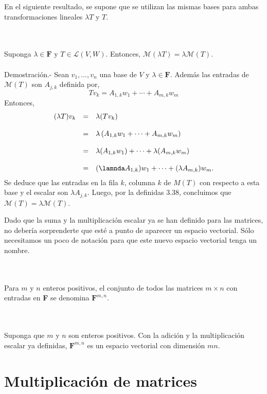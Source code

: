 En el siguiente resultado, se supone que se utilizan las mismas bases para ambas transformaciones lineales $\lambda T$ y $T$.

\begin{myteo}\;\\\\
    Suponga $\lambda \in \textbf{F}$ y $T\in \mathcal{L}(V,W)$. Entonces, $\mathcal{M}(\lambda T)=\lambda \mathcal{M}(T)$.\\\\
	Demostración.-\; Sean $v_1,\ldots, v_n$ una base de $V$ y $\lambda \in \textbf{F}$. Además las entradas de $\mathcal{M}(T)$ son $A_{j,k}$ definida por,
	$$Tv_k=A_{1,k}w_1+\cdots+A_{m,k}w_m$$
	Entonces,
	$$
	\begin{array}{rcl}
	(\lambda T)v_k&=& \lambda(Tv_k)\\\\
		&=&\lambda\left(A_{1,k}w_1+\cdots +A_{m,k}w_m\right)\\\\
		&=&\lambda(A_{1,k}w_1)+\cdots +\lambda(A_{m,k}w_m)\\\\
		&=&(\lamnda A_{1,k})w_1+\cdots +(\lambda A_{m,k})w_m.
	\end{array}
	$$
	Se deduce que las entradas en la fila $k$, columna $k$ de $M(T)$ con respecto a esta base y el escalar son $\lambda A_{j,k}$. Luego, por la definidas 3.38, concluimos que $\mathcal{M}(T) =  \lambda \mathcal{M}(T)$.
\end{myteo}

Dado que la suma y la multiplicación escalar ya se han definido para las matrices, no debería sorprenderte que esté a punto de aparecer un espacio vectorial. Sólo necesitamos un poco de notación para que este nuevo espacio vectorial tenga un nombre.

\begin{mydef}\;\\\\
    Para $m$ y $n$ enteros positivos, el conjunto de todos las matrices $m\times n$ con entradas en \textbf{F} se denomina $\textbf{F}^{m,n}$.
\end{mydef}

\begin{myteo}[\boldmath $\dim \textbf{F}^{m,n}=mn$]\,\\\\
    Suponga que $m$ y $n$ son enteros positivos. Con la adición y la multiplicación escalar ya definidas, $\textbf{F}^{m,n}$ es un espacio vectorial con dimensión $mn$.
\end{myteo}

\section{Multiplicación de matrices}



